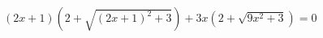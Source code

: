 \begin{ex}[type=equation]
	\begin{condition}
		\( (2x+1)(2+\sqrt{(2x+1)^2+3})+3x(2+\sqrt{9x^2+3})=0 \)
	\end{condition}
\end{ex}